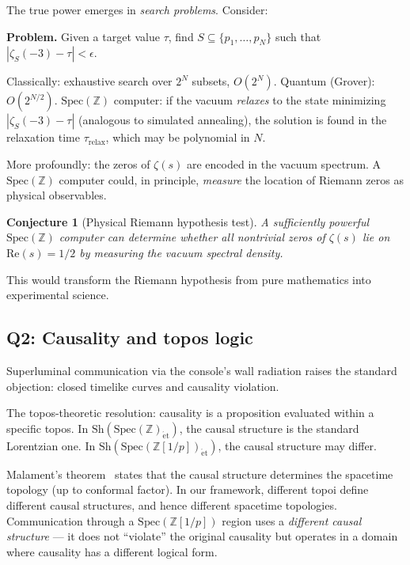 \documentclass[11pt,a4paper]{article}
\newtheorem{conjecture}[theorem]{Conjecture}
\newcommand{\Spec}{\mathrm{Spec}}
\newcommand{\Zp}{\mathbb{Z}[1/p]}
\newcommand{\Sh}{\mathrm{Sh}}
\begin{document}
The true power emerges in \emph{search problems}. Consider:

\textbf{Problem.} Given a target value $\tau$, find
$S \subseteq \{p_1, \ldots, p_N\}$ such that
$|\zeta_S(-3) - \tau| < \epsilon$.

Classically: exhaustive search over $2^N$ subsets, $O(2^N)$.
Quantum (Grover): $O(2^{N/2})$.
$\Spec(\mathbb{Z})$ computer: if the vacuum \emph{relaxes} to the
state minimizing $|\zeta_S(-3) - \tau|$ (analogous to simulated
annealing), the solution is found in the relaxation time
$\tau_{\mathrm{relax}}$, which may be polynomial in $N$.

More profoundly: the zeros of $\zeta(s)$ are encoded in the vacuum
spectrum. A $\Spec(\mathbb{Z})$ computer could, in principle,
\emph{measure} the location of Riemann zeros as physical observables.

\begin{conjecture}[Physical Riemann hypothesis test]
\label{conj:riemann}
A sufficiently powerful $\Spec(\mathbb{Z})$ computer can determine
whether all nontrivial zeros of $\zeta(s)$ lie on
$\mathrm{Re}(s) = 1/2$ by measuring the vacuum spectral density.
\end{conjecture}

This would transform the Riemann hypothesis from pure mathematics
into experimental science.

\subsection{Q2: Causality and topos logic}

Superluminal communication via the console's wall radiation
raises the standard objection: closed timelike curves and
causality violation.

The topos-theoretic resolution: causality is a proposition
evaluated within a specific topos. In
$\Sh(\Spec(\mathbb{Z})_{\mathrm{\acute{e}t}})$, the causal
structure is the standard Lorentzian one. In
$\Sh(\Spec(\Zp)_{\mathrm{\acute{e}t}})$, the causal structure
may differ.

Malament's theorem~\cite{Malament1977} states that the causal
structure determines the spacetime topology (up to conformal
factor). In our framework, different topoi define different
causal structures, and hence different spacetime topologies.
Communication through a $\Spec(\Zp)$ region uses a
\emph{different causal structure} --- it does not ``violate''
the original causality but operates in a domain where
causality has a different logical form.
\end{document}
